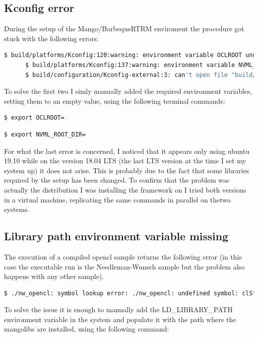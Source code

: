 \subsection{Kconfig error}
During the setup of the Mango/BarbequeRTRM enviroment the procedure got stuck with the following errors:
\begin{lstlisting}[language=bash]
      $ build/platforms/Kconfig:120:warning: environment variable OCLROOT undefined//
      $ build/platforms/Kconfig:137:warning: environment variable NVML_ROOT_DIR undefined//
      $ build/configuration/Kconfig-external:3: can't open file "build/configuration/Kconfig-external-required"
\end{lstlisting}

To solve the first two I simly manually added the required environment variables, setting them to an empty value, using the following terminal commands:

\begin{lstlisting}[language=bash]
      $ export OCLROOT=
\end{lstlisting}

\begin{lstlisting}[language=bash]
      $ export NVML_ROOT_DIR=
\end{lstlisting}

For what the last error is concerned, I noticed that it appears only using ubuntu 19.10 while on the version 18.04 LTS (the last LTS version at the time I set my system up) it does not arise. This is probably due to the fact that some libraries required by the setup has been changed. To confirm that the problem was actually the distribution I was installing the framework on I tried both versions in a virtual machine, replicating the same commands in parallel on thetwo systems.

\subsection{Library path environment variable missing}
The execution of a compiled opencl sample returns the following error (in this case the executable run is the Needleman-Wunsch sample but the problem also happens with any other sample).

\begin{lstlisting}[language=bash]
      $ ./nw_opencl: symbol lookup error: ./nw_opencl: undefined symbol: clStartComputation
\end{lstlisting}

To solve the issue it is enough to manually add the LD\_LIBRARY\_PATH environment variable in the system and populate it with the path where the mangolibs are installed, using the following command:

